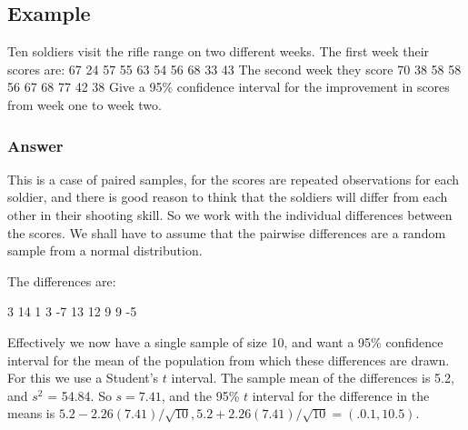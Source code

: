 \documentclass[a4paper,12pt]{article}
\begin{document}
\subsection{Example}
Ten soldiers visit the rifle range on two different weeks. The first
week their scores are:
67 24 57 55 63 54 56 68 33 43
The second week they score
70 38 58 58 56 67 68 77 42 38
Give a 95\% confidence interval for the improvement in scores from week one to
week two.


\subsubsection{Answer}


This is a case of paired samples, for the scores are repeated observations for each
soldier, and there is good reason to think that the soldiers will differ from each other
in their shooting skill. So we work with the individual differences between the scores.
We shall have to assume that the pairwise differences are a random sample from a
normal distribution.

The differences are:

3 14 1 3 -7 13 12 9 9 -5


Effectively we now have a single sample of size 10, and want a 95\% confidence
interval for the mean of the population from which these differences are drawn. For
this we use a Student's $t$ interval. The sample mean of the differences is 5.2, and
$s^2$ = 54.84. So $s = 7.41$, and the 95\% $t$ interval for the difference in the means is
$5.2 - 2.26(7.41)/\sqrt{10},  5.2 + 2.26(7.41)/\sqrt{10} = (.0.1, 10.5)$.
\end{document}
